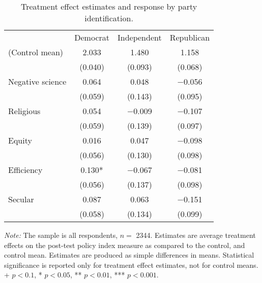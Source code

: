 \begin{table*}

\caption{Treatment effect estimates and response by party identification.\label{tab:party_dim}}
\centering
\begin{threeparttable}
\begin{tabular}[t]{lccc}
\toprule
  & Democrat & Independent & Republican\\
\cmidrule(lr){2-2} \cmidrule(lr){3-3} \cmidrule(lr){4-4}
(Control mean) & \num{2.033} & \num{1.480} & \num{1.158}\\
 & (\num{0.040}) & (\num{0.093}) & (\num{0.068})\\
Negative science & \num{0.064} & \num{0.048} & \num{-0.056}\\
 & (\num{0.059}) & (\num{0.143}) & (\num{0.095})\\
Religious & \num{0.054} & \num{-0.009} & \num{-0.107}\\
 & (\num{0.059}) & (\num{0.139}) & (\num{0.097})\\
Equity & \num{0.016} & \num{0.047} & \num{-0.098}\\
 & (\num{0.056}) & (\num{0.130}) & (\num{0.098})\\
Efficiency & \num{0.130}* & \num{-0.067} & \num{-0.081}\\
 & (\num{0.056}) & (\num{0.137}) & (\num{0.098})\\
Secular & \num{0.087} & \num{0.063} & \num{-0.151}\\
 & (\num{0.058}) & (\num{0.134}) & (\num{0.099})\\
\bottomrule
\end{tabular}
\begin{tablenotes}
\item \footnotesize \textit{Note:} The sample is all respondents, $n = $ \num{2344}. Estimates are average treatment effects on the post-test policy index measure as compared to the control, and control mean. Estimates are produced as simple differences in means. Statistical significance is reported only for treatment effect estimates, not for control means. + $p < 0.1$, * $p < 0.05$, ** $p < 0.01$, *** $p < 0.001$.
\end{tablenotes}
\end{threeparttable}
\end{table*}
